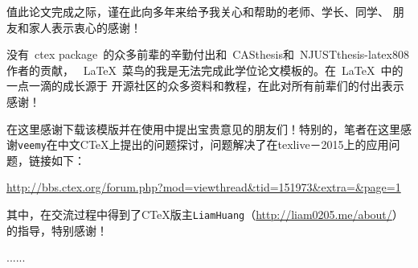 \begin{thanks}

值此论文完成之际，谨在此向多年来给予我关心和帮助的老师、学长、同学、
朋友和家人表示衷心的感谢！

没有~ctex package~的众多前辈的辛勤付出和~CASthesis和~NJUSTthesis-latex808作者的贡献，
~\LaTeX{}~菜鸟的我是无法完成此学位论文模板的。在~\LaTeX{}~中的一点一滴的成长源于
开源社区的众多资料和教程，在此对所有前辈们的付出表示感谢！

在这里感谢下载该模版并在使用中提出宝贵意见的朋友们！特别的，笔者在这里感谢\texttt{veemy}在中文CTeX上提出的问题探讨，问题解决了在texlive－2015上的应用问题，链接如下：

\url{http://bbs.ctex.org/forum.php?mod=viewthread&tid=151973&extra=&page=1}

其中，在交流过程中得到了CTeX版主\texttt{LiamHuang}（\url{http://liam0205.me/about/}）的指导，特别感谢！

......

\vskip 18pt

\end{thanks}